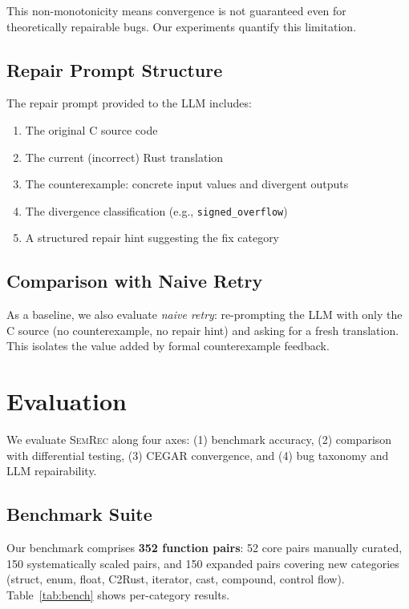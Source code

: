 \documentclass[11pt]{article}
\newcommand{\semrec}{\textsc{SemRec}}
\begin{document}
This non-monotonicity means convergence is not guaranteed even for
theoretically repairable bugs.  Our experiments quantify this limitation.

\subsection{Repair Prompt Structure}

The repair prompt provided to the LLM includes:
\begin{enumerate}[nosep,leftmargin=*]
\item The original C source code
\item The current (incorrect) Rust translation
\item The counterexample: concrete input values and divergent outputs
\item The divergence classification (e.g., \texttt{signed\_overflow})
\item A structured repair hint suggesting the fix category
\end{enumerate}

\subsection{Comparison with Naive Retry}

As a baseline, we also evaluate \emph{naive retry}: re-prompting the LLM
with only the C source (no counterexample, no repair hint) and asking for
a fresh translation.  This isolates the value added by formal counterexample
feedback.

\section{Evaluation}\label{sec:eval}

We evaluate \semrec{} along four axes: (1) benchmark accuracy,
(2) comparison with differential testing, (3) CEGAR convergence, and
(4) bug taxonomy and LLM repairability.

\subsection{Benchmark Suite}\label{sec:eval:bench}

Our benchmark comprises \textbf{352 function pairs}: 52 core pairs manually
curated, 150 systematically scaled pairs, and 150 expanded pairs covering
new categories (struct, enum, float, C2Rust, iterator, cast, compound,
control flow).
Table~\ref{tab:bench} shows per-category results.
\end{document}
